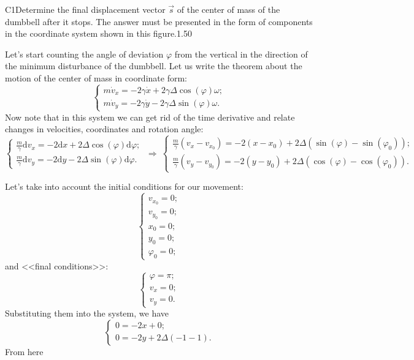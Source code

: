 \documentclass[11pt,a4paper]{article}
\begin{document}
\begin{solcard}{C1}{Determine the final displacement vector $\vec{s}$ of the center of mass of the dumbbell after it stops. The answer must be presented in the form of components in the coordinate system shown in this figure.}{1.50}

Let's start counting the angle of deviation $\varphi$ from the vertical in the direction of the minimum disturbance of the dumbbell. Let us write the theorem about the motion of the center of mass in coordinate form: \begin{equation} \begin{cases} m\dot{v}_x = -2\gamma \dot{x} + 2\gamma\Delta\cos(\varphi)\omega;\\ m\dot{v}_y = -2\gamma \dot{y} - 2\gamma\Delta\sin(\varphi)\omega. \end{cases} \end{equation} Now note that in this system we can get rid of the time derivative and relate changes in velocities, coordinates and rotation angle: \begin{equation} \begin{cases} \frac{m}{\gamma}\mathrm{d}v_x = -2\mathrm{d}x + 2\Delta\cos(\varphi)\mathrm{d}\varphi;\\ \frac{m}{\gamma}\mathrm{d}v_y = -2\mathrm{d}y - 2\Delta\sin(\varphi)\mathrm{d}\varphi. \end{cases} ~\Rightarrow~ \begin{cases} \frac{m}{\gamma}\left(v_x - v_{x_0}\right) = -2\left(x - x_0\right) + 2\Delta\left(\sin(\varphi) - \sin(\varphi_0)\right);\\ \frac{m}{\gamma}\left(v_y - v_{y_0}\right) = -2(y - y_0) + 2\Delta\left(\cos(\varphi) - \cos(\varphi_0)\right). \end{cases} \end{equation}


Let's take into account the initial conditions for our movement: \begin{equation} \begin{cases} v_{x_0} = 0;\\ v_{y_0} = 0;\\ x_0 = 0;\\ y_0 = 0;\\ \varphi_0 = 0; \end{cases} \end{equation} and <<final conditions>>: \begin{equation} \begin{cases} \varphi = \pi;\\ v_x = 0;\\ v_y = 0. \end{cases} \end{equation} Substituting them into the system, we have \begin{equation} \begin{cases} 0 = -2x + 0;\\ 0 = -2y + 2\Delta\left(-1 -1\right). \end{cases} \end{equation} From here


\end{solcard}
\end{document}

